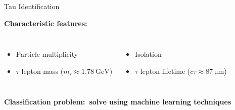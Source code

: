 \documentclass[11pt, xcolor={dvipsnames}, aspectratio=169]{beamer}
\begin{document}
\begin{frame}{Tau Identification}
  \vspace*{0.5em}

  \textbf{Characteristic features:}%

  \begin{columns}[onlytextwidth]

    \begin{itemize}
    \item Particle multiplicity
    \item $\tau$ lepton mass ($m_\tau \approx \SI{1.78}{\GeV}$)
    \end{itemize}


    \begin{itemize}
    \item Isolation
    \item $\tau$ lepton lifetime ($c\tau \approx \SI{87}{\micro\meter}$)
    \end{itemize}
  \end{columns}

  \vspace*{1.25em}
  \pause

  \textbf{\ra Classification problem:\ solve using machine learning techniques}



\end{frame}

\end{document}
